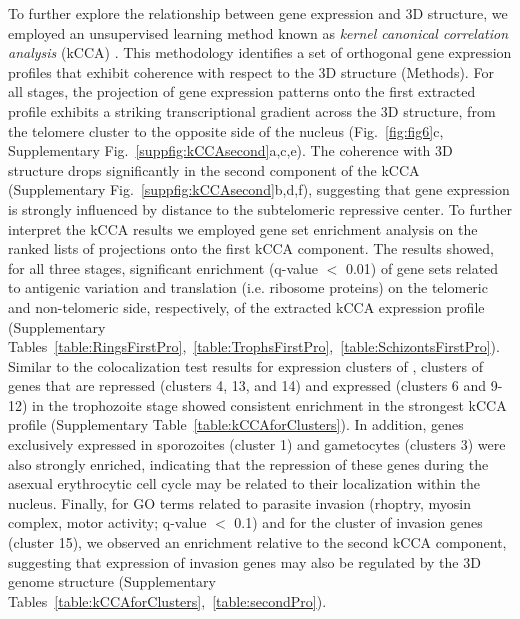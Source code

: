 To further explore the relationship between gene expression and 3D structure, we employed an unsupervised learning method known as {\em kernel canonical correlation analysis} (kCCA) \citep{bach:kernel}. This methodology identifies a set of orthogonal gene expression profiles that exhibit coherence with respect to the 3D structure (Methods). For all stages, the projection of gene expression patterns onto the first extracted profile exhibits a striking transcriptional gradient across the 3D structure, from the telomere cluster to the opposite side of the nucleus  (Fig.~\ref{fig:fig6}c, Supplementary Fig.~\ref*{suppfig:kCCAsecond}a,c,e). The coherence with 3D structure drops significantly in the second component of the kCCA (Supplementary Fig.~\ref*{suppfig:kCCAsecond}b,d,f), suggesting that gene expression is strongly influenced by distance to the subtelomeric repressive center. To further interpret the kCCA results we employed gene set enrichment analysis \citep{subramanian:gene} on the ranked lists of projections onto the first kCCA component. The results showed, for all three stages, significant enrichment (q-value $<$ 0.01) of gene sets related to antigenic variation and translation (i.e. ribosome proteins) on the telomeric and non-telomeric side, respectively, of the extracted kCCA expression profile (Supplementary Tables~\ref*{table:RingsFirstPro},~\ref*{table:TrophsFirstPro},~\ref*{table:SchizontsFirstPro}). Similar to the colocalization test results for expression clusters of \cite{leroch:discovery}, clusters of genes that are repressed (clusters 4, 13, and 14) and expressed (clusters 6 and 9-12) in the trophozoite stage showed consistent enrichment in the strongest kCCA profile (Supplementary Table~\ref*{table:kCCAforClusters}). In addition, genes exclusively expressed in sporozoites (cluster 1) and gametocytes (clusters 3) were also strongly enriched, indicating that the repression of these genes during the asexual erythrocytic cell cycle may be related to their localization within the nucleus. Finally, for GO terms related to parasite invasion (rhoptry, myosin complex, motor activity; q-value $<$ 0.1) and for the cluster of invasion genes (cluster 15), we observed an enrichment relative to the second kCCA component, suggesting that expression of invasion genes may also be regulated by the 3D genome structure (Supplementary Tables~\ref*{table:kCCAforClusters},~\ref*{table:secondPro}).


